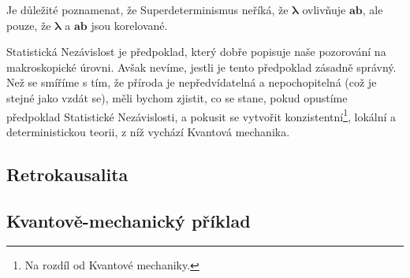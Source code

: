Je důležité poznamenat, že Superdeterminismus neříká, že $\bm{\lambda}$ ovlivňuje $\bm{ab}$, ale pouze, že $\bm{\lambda}$ a $\bm{ab}$ jsou korelované.

Statistická Nezávislost je předpoklad, který dobře popisuje naše pozorování na ma\-kroskopické úrovni. Avšak nevíme, jestli je tento předpoklad zásadně správný. Než se smíříme s tím, že příroda je nepředvídatelná a nepochopitelná (což je stejné jako vzdát se), měli bychom zjistit, co se stane, pokud opustíme předpoklad Statistické Nezávislosti, a pokusit se vytvořit konzistentní\footnote[12]{Na rozdíl od Kvantové mechaniky.}, lokální a deterministickou teorii, z níž vychází Kvantová mechanika.

\subsection{Retrokausalita}

\subsection{Kvantově-mechanický příklad}